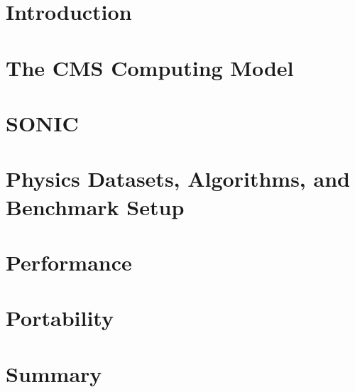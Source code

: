 \section{Introduction}
\label{sec:intro}


\section{The CMS Computing Model}
\label{sec:cmscomputing}


\section{SONIC}
\label{sec:sonic}



\section{Physics Datasets, Algorithms, and Benchmark Setup}
\label{sec:algo}



\section{Performance}
\label{sec:performances}


\section{Portability}
\label{sec:IPUs}


\section{Summary}
\label{sec:summary}



\clearpage
\begin{acknowledgments}
\end{acknowledgments}

